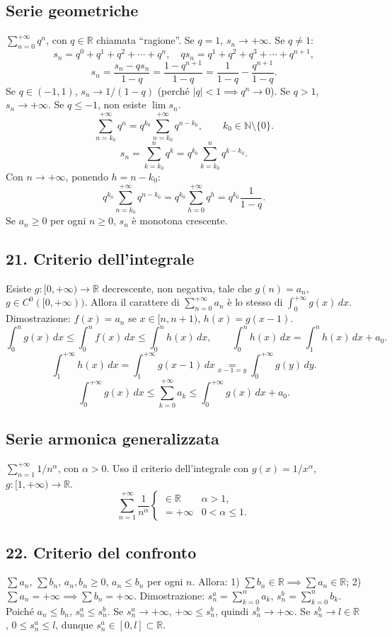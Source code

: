 \documentclass[11pt,a4paper]{article}
\newcommand{\R}{\mathbb R}\newcommand{\N}{\mathbb N}\newcommand{\pagina}[1]{\clearpage}
\begin{document}
\subsection*{Serie geometriche}
$\sum_{n=0}^{+\infty}q^n$, con $q\in\R$ chiamata ``ragione''. Se $q=1$, $s_n\to+\infty$. Se $q\ne1$:
\[s_n=q^0+q^1+q^2+\cdots+q^n,\quad qs_n=q^1+q^2+q^3+\cdots+q^{n+1},\]
\[s_n=\frac{s_n-qs_n}{1-q}=\frac{1-q^{n+1}}{1-q}=\frac1{1-q}-\frac{q^{n+1}}{1-q}.\]
Se $q\in(-1,1)$, $s_n\to1/(1-q)$ (perché $|q|<1\implies q^n\to0$). Se $q>1$, $s_n\to+\infty$. Se $q\le-1$, non esiste $\lim s_n$.
\[\sum_{n=k_0}^{+\infty}q^n=q^{k_0}\sum_{n=k_0}^{+\infty}q^{n-k_0},\qquad k_0\in\N\setminus\{0\}.\]
\[s_n=\sum_{k=k_0}^nq^k=q^{k_0}\sum_{k=k_0}^nq^{k-k_0}.\]
Con $n\to+\infty$, ponendo $h=n-k_0$:
\[q^{k_0}\sum_{n=k_0}^{+\infty}q^{n-k_0}=q^{k_0}\sum_{h=0}^{+\infty}q^h=q^{k_0}\frac1{1-q}.\]
Se $a_n\ge0$ per ogni $n\ge0$, $s_n$ è monotona crescente.
\pagina{56}
\subsection*{21. Criterio dell'integrale}
Esiste $g:[0,+\infty)\to\R$ decrescente, non negativa, tale che $g(n)=a_n$, $g\in C^0([0,+\infty))$. Allora il carattere di $\sum_{n=0}^{+\infty}a_n$ è lo stesso di $\int_0^{+\infty}g(x)\,dx$.
Dimostrazione: $f(x)=a_n$ se $x\in[n,n+1)$, $h(x)=g(x-1)$.
\[\int_0^n g(x)\,dx\le\int_0^nf(x)\,dx\le\int_0^nh(x)\,dx,\qquad\int_0^nh(x)\,dx=\int_1^nh(x)\,dx+a_0.\]
\[\int_1^{+\infty}h(x)\,dx=\int_1^{+\infty}g(x-1)\,dx\underset{x-1=y}=\int_0^{+\infty}g(y)\,dy.\]
\[\int_0^{+\infty}g(x)\,dx\le\sum_{k=0}^{+\infty}a_k\le\int_0^{+\infty}g(x)\,dx+a_0.\]
\subsection*{Serie armonica generalizzata}
$\sum_{n=1}^{+\infty}1/n^\alpha$, con $\alpha>0$. Uso il criterio dell'integrale con $g(x)=1/x^\alpha$, $g:[1,+\infty)\to\R$.
\[\sum_{n=1}^{+\infty}\frac1{n^\alpha}\begin{cases}\in\R&\alpha>1,\\=+\infty&0<\alpha\le1.\end{cases}\]
\pagina{57}
\subsection*{22. Criterio del confronto}
$\sum a_n$, $\sum b_n$, $a_n,b_n\ge0$, $a_n\le b_n$ per ogni $n$. Allora: 1) $\sum b_n\in\R\implies\sum a_n\in\R$; 2) $\sum a_n=+\infty\implies\sum b_n=+\infty$.
Dimostrazione: $s_n^a=\sum_{k=0}^na_k$, $s_n^b=\sum_{k=0}^nb_k$. Poiché $a_n\le b_n$, $s_n^a\le s_n^b$. Se $s_n^a\to+\infty$, $+\infty\le s_n^b$, quindi $s_n^b\to+\infty$. Se $s_n^b\to l\in\R$, $0\le s_n^a\le l$, dunque $s_n^a\in[0,l]\subset\R$.
\end{document}
